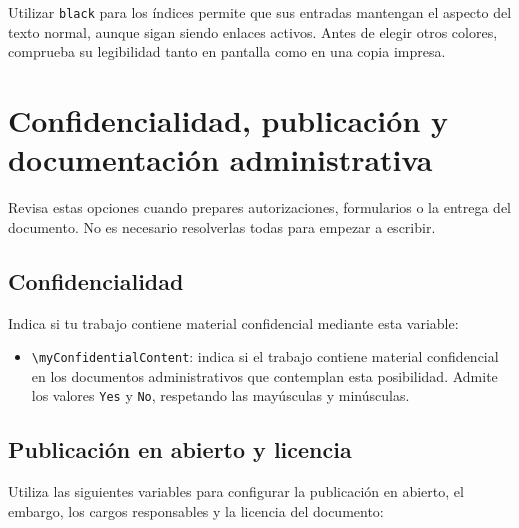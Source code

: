 Utilizar \texttt{black} para los índices permite que sus entradas mantengan el aspecto del texto normal, aunque sigan siendo enlaces activos. Antes de elegir otros colores, comprueba su legibilidad tanto en pantalla como en una copia impresa.

\section{Confidencialidad, publicación y documentación administrativa}

Revisa estas opciones cuando prepares autorizaciones, formularios o la entrega del documento. No es necesario resolverlas todas para empezar a escribir.

\subsection{Confidencialidad}

Indica si tu trabajo contiene material confidencial mediante esta variable:

\begin{itemize}
  \item \texttt{\textbackslash{}myConfidentialContent}: indica si el trabajo contiene material confidencial en los documentos administrativos que contemplan esta posibilidad. Admite los valores \texttt{Yes} y \texttt{No}, respetando las mayúsculas y minúsculas.
\end{itemize}

\subsection{Publicación en abierto y licencia}

Utiliza las siguientes variables para configurar la publicación en abierto, el embargo, los cargos responsables y la licencia del documento:

